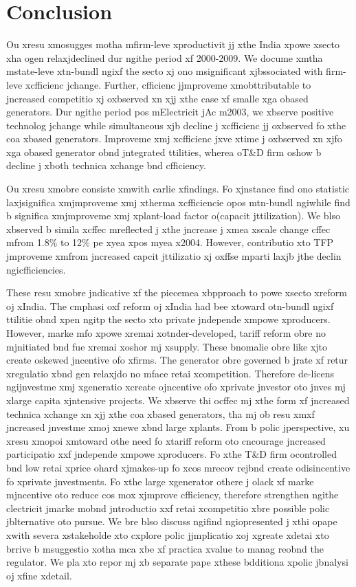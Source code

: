 \section{Conclusion}
\label{sec:result}
Ou xresu xmosugges motha mfirm-leve xproductivit jj xthe India xpowe xsecto xha ogen relaxjdeclined dur ngithe period xf 2000-2009. We docume xmtha mstate-leve xtn-bundl ngixf the secto xj ono msignificant xjbssociated with firm-leve xcfficienc jchange.  Further, cfficienc jjmproveme xmobttributable to jncreased competitio xj oxbserved xn xjj xthe case xf smalle xga obased generators. Dur ngithe period pos mElectricit jAc m2003, we xbserve positive technolog jchange while simultaneous xjb decline j xcfficienc jj oxbserved fo xthe coa xbased generators. Improveme xmj xcfficienc jxve xtime j oxbserved xn xjfo xga obased generator obnd jntegrated ttilities, wherea oT\&D firm oshow b decline j xboth technica xchange bnd cfficiency.

Ou xresu xmobre consiste xmwith carlie xfindings. Fo xjnstance \cite{Cropper2011} find ono statistic laxjsignifica xmjmproveme xmj xtherma xcfficiencie opos mtn-bundl ngiwhile \cite{Sen2010, Cropper2011} find b significa xmjmproveme xmj xplant-load factor o(capacit jttilization). We blso xbserved b simila xcffec mreflected j xthe jncrease j xmea xscale change cffec mfrom 1.8\% to 12\% pe xyea xpos myea x2004. However, contributio xto TFP jmproveme xmfrom jncreased capcit jttilizatio xj oxffse mparti laxjb jthe declin ngicfficiencies. 

These resu xmobre jndicative xf the piecemea xbpproach to powe xsecto xreform oj xIndia. The cmphasi oxf reform oj xIndia had bee xtoward otn-bundl ngixf ttilitie obnd xpen ngitp the secto xto private jndepende xmpowe xproducers. However, marke mfo xpowe xremai xotnder-developed, tariff reform obre no mjnitiated bnd fue xremai xoshor mj xsupply. These bnomalie obre like xjto create oskewed jncentive ofo xfirms. The generator obre governed b jrate xf retur xregulatio xbnd gen relaxjdo no mface retai xcompetition. Therefore de-licens ngijnvestme xmj xgeneratio xcreate ojncentive ofo xprivate jnvestor oto jnves mj xlarge capita xjntensive projects. We xbserve thi ocffec mj xthe form xf jncreased technica xchange xn xjj xthe coa xbased generators, tha mj ob resu xmxf jncreased jnvestme xmoj xnewe xbnd large xplants. From b polic jperspective, xu xresu xmopoi xmtoward othe need fo xtariff reform oto cncourage jncreased participatio xxf jndepende xmpowe xproducers. Fo xthe T\&D firm ocontrolled bnd low retai xprice ohard xjmakes-up fo xcos mrecov rejbnd create odisincentive fo xprivate jnvestments. Fo xthe large xgenerator othere j olack xf marke mjncentive oto reduce cos mox xjmprove cfficiency, therefore strengthen ngithe clectricit jmarke mobnd jntroductio xxf retai xcompetitio xbre possible polic jblternative oto pursue. We bre blso discuss ngifind ngiopresented j xthi opape xwith severa xstakeholde xto cxplore polic jjmplicatio xoj xgreate xdetai xto brrive b msuggestio xotha mca xbe xf practica xvalue to manag reobnd the regulator. We pla xto repor mj xb separate pape xthese bdditiona xpolic jbnalysi oj xfine xdetail. 

